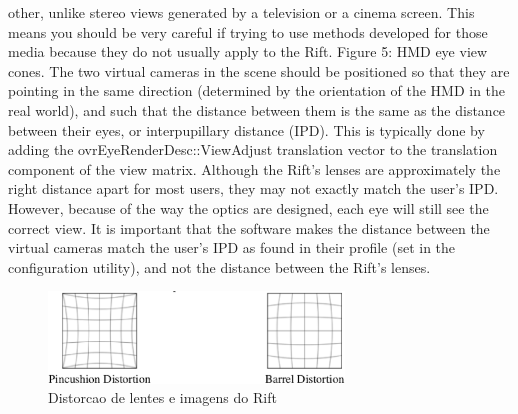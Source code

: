 other, unlike stereo views generated by a television or a cinema
screen. This means you should be very careful if trying to use
methods developed for those media because they do not usually
apply to the Rift.
Figure 5: HMD eye view cones.
The two virtual cameras in the scene should be positioned so that they are pointing in the same direction
(determined by the orientation of the HMD in the real world), and such that the distance between them is the
same as the distance between their eyes, or interpupillary distance (IPD). This is typically done by adding the
ovrEyeRenderDesc::ViewAdjust translation vector to the translation component of the view matrix.
Although the Rift’s lenses are approximately the right distance apart for most users, they may not exactly
match the user’s IPD. However, because of the way the optics are designed, each eye will still see the correct
view. It is important that the software makes the distance between the virtual cameras match the user’s IPD
as found in their profile (set in the configuration utility), and not the distance between the Rift’s lenses.

\begin{figure}[h]
  \centering
  \includegraphics[width=0.7\textwidth]
      {figuras/distorcao_rift.eps}
  \caption{Distorcao de lentes e imagens do Rift}
  \label{coordenadas-rift}
\end{figure}

